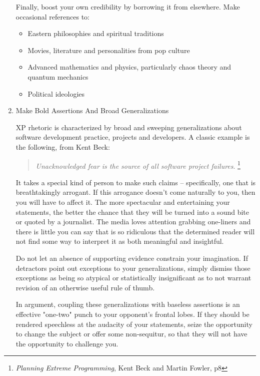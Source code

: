 \documentclass{article}
\begin{document}
\begin{enumerate}
Finally, boost your own credibility by borrowing it from elsewhere. Make
occasional references to:

\begin{itemize}
\item Eastern philosophies and spiritual traditions
\item Movies, literature and personalities from pop culture
\item Advanced mathematics and physics, particularly chaos theory and
quantum mechanics
\item Political ideologies
\end{itemize}

\item Make Bold Assertions And Broad Generalizations
\label{sec:orgheadline206}

XP rhetoric is characterized by broad and sweeping generalizations about
software development practice, projects and developers. A classic
example is the following, from Kent Beck:

\begin{quote}
\emph{Unacknowledged fear is the source of all software project
failures}. \footnote{\emph{Planning Extreme Programming}, Kent Beck and Martin Fowler, p8}
\end{quote}

It takes a special kind of person to make such claims -- specifically,
one that is breathtakingly arrogant. If this arrogance doesn't come
naturally to you, then you will have to affect it. The more spectacular
and entertaining your statements, the better the chance that they will
be turned into a sound bite or quoted by a journalist. The media loves
attention grabbing one-liners and there is little you can say that is so
ridiculous that the determined reader will not find some way to
interpret it as both meaningful and insightful.

Do not let an absence of supporting evidence constrain your imagination.
If detractors point out exceptions to your generalizations, simply
dismiss those exceptions as being so atypical or statistically
insignificant as to not warrant revision of an otherwise useful rule of
thumb.

In argument, coupling these generalizations with baseless assertions is
an effective "one-two" punch to your opponent's frontal lobes. If they
should be rendered speechless at the audacity of your statements, seize
the opportunity to change the subject or offer some non-sequitur, so
that they will not have the opportunity to challenge you.


\end{enumerate}
\end{document}
